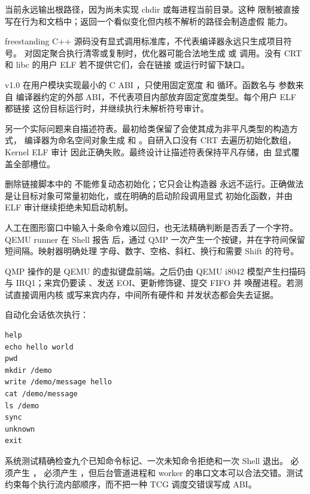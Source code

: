  当前永远输出根路径，因为尚未实现 chdir 或每进程当前目录。这种
限制被直接写在行为和文档中；返回一个看似变化但内核不解析的路径会制造虚假
能力。

freestanding C++ 源码没有显式调用标准库，不代表编译器永远只生成项目符号。
对固定聚合执行清零或复制时，优化器可能合法地生成  或
 调用。没有 CRT 和 libc 的用户 ELF 若不提供它们，会在链接
或运行时留下缺口。

v1.0 在用户模块实现最小的 C ABI ，只使用固定宽度
 和  循环。函数名与  参数来自
编译器约定的外部 ABI，不代表项目内部放弃固定宽度类型。每个用户 ELF 都链接
这份目标运行时，并继续执行未解析符号审计。

另一个实际问题来自描述符表。最初给类保留了会使其成为非平凡类型的构造方式，
编译器为命名空间对象生成  和
。自研入口没有 CRT 去遍历初始化数组，Kernel ELF 审计
因此正确失败。最终设计让描述符表保持平凡存储，由
 显式覆盖全部槽位。

\begin{failurebox}
删除链接脚本中的  不能修复动态初始化；它只会让构造器
永远不运行。正确做法是让目标对象可常量初始化，或在明确的启动阶段调用显式
初始化函数，并由 ELF 审计继续拒绝未知启动机制。
\end{failurebox}

人工在图形窗口中输入十条命令难以回归，也无法精确判断是否丢了一个字符。
QEMU runner 在 Shell 报告  后，通过 QMP
 一次产生一个按键，并在字符间保留短间隔。映射器明确处理
字母、数字、空格、斜杠、换行和需要 Shift 的符号。

QMP 操作的是 QEMU 的虚拟键盘前端。之后仍由 QEMU i8042 模型产生扫描码与
IRQ1；来宾仍要读 、发送 EOI、更新修饰键、提交 FIFO 并
唤醒进程。若测试直接调用内核  或写来宾内存，中间所有硬件和
并发状态都会失去证据。

自动化会话依次执行：

\begin{lstlisting}
help
echo hello world
pwd
mkdir /demo
write /demo/message hello
cat /demo/message
ls /demo
sync
unknown
exit
\end{lstlisting}

系统测试精确检查九个已知命令标记、一次未知命令拒绝和一次 Shell 退出。
 必须产生 ， 必须产生
，但后台管道进程和 worker 的串口文本可以合法交错。测试
约束每个执行流内部顺序，而不把一种 TCG 调度交错误写成 ABI。

